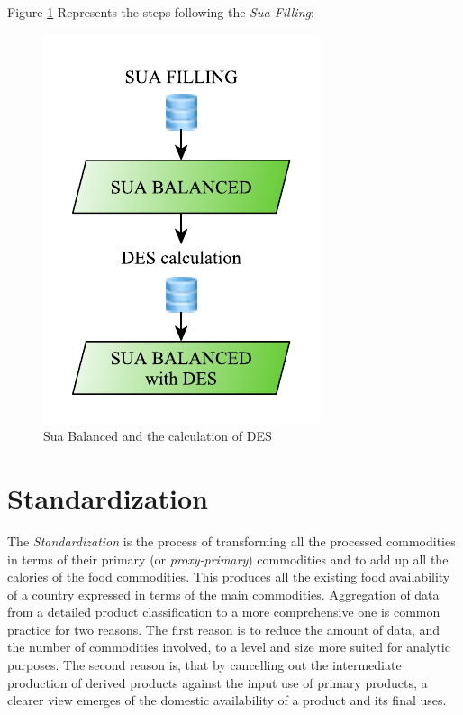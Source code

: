 \documentclass[]{article}
\begin{document}
Figure \ref{fig:f8} Represents the steps following the \emph{Sua
Filling}:

\begin{figure}[H]

{\centering \includegraphics{images/StandBal/08_SuaBalanced} 

}

\caption{\label{fig:f8}Sua Balanced and the calculation of DES}\label{fig:f8}
\end{figure}

\section{Standardization}\label{standardization}

The \emph{Standardization} is the process of transforming all the
processed commodities in terms of their primary (or
\emph{proxy-primary}) commodities and to add up all the calories of the
food commodities. This produces all the existing food availability of a
country expressed in terms of the main commodities. Aggregation of data
from a detailed product classification to a more comprehensive one is
common practice for two reasons. The first reason is to reduce the
amount of data, and the number of commodities involved, to a level and
size more suited for analytic purposes. The second reason is, that by
cancelling out the intermediate production of derived products against
the input use of primary products, a clearer view emerges of the
domestic availability of a product and its final uses.
\end{document}
